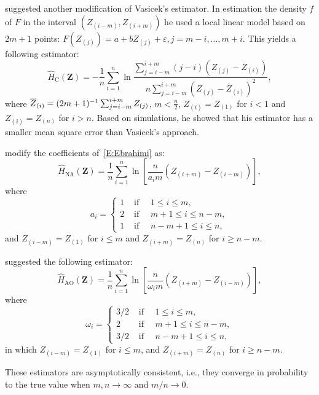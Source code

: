  \citet{correa1995new} suggested another modification of Vasicek's estimator. 
In estimation the density $f$ of $F$ in the interval $\left(Z_{(i-m)}, Z_{(i+m)}\right)$ he used a local linear model based on $2 m+1$ points: $F\left(Z_{(j)}\right)=a+b Z_{(j)}+\varepsilon, j=m-i, \ldots, m+i$. This yields a following estimator:
  \begin{equation}
	\label{E:Correa}
  \widehat{H}_{\text{C}}(\bm{Z})=-\frac{1}{n} \sum_{i=1}^n \ln \frac{\sum_{j=i-m}^{i+m}(j-i)\left(Z_{(j)}-\overline{Z}_{(i)}\right)}{n\sum_{j=i-m}^{i+m}\left(Z_{(j)}-\overline{Z}_{(i)}\right)^2},
  \end{equation} where
  \(\overline{Z}_{(i)}=(2 m+1)^{-1} \sum_{j=i-m}^{i+m} Z_{(j)}\),
  \(m< \frac{n}{2}\), \(Z_{(i)}=Z_{(1)}\) for \(i<1\) and
  \(Z_{(i)}=Z_{(n)}\) for \(i>n\). Based on simulations, he showed that
  his estimator has a smaller mean square error than Vasicek's approach.
	
	 
\citet{rohtua} modify the coefficients of~\eqref{E:Ebrahimi} as: 
\begin{equation}
\label{E:NA}
\widehat{H}_{\text{NA}}(\bm{Z})=\frac{1}{n} \sum_{i=1}^n \ln \left[\frac{n}{a_i m}\left(Z_{(i+m)}-Z_{(i-m)}\right)\right],
\end{equation}
where
$$
a_i=\begin{cases}
1 & \text { if } \quad 1 \leq i \leq m, \\
2 & \text { if } \quad m+1 \leq i \leq n-m, \\
1 & \text { if } \quad n-m+1 \leq i \leq n,
\end{cases}
$$
and $Z_{(i-m)}=Z_{(1)}$ for $i \leq m$ and $Z_{(i+m)}=Z_{(n)}$ for $i \geq n-m$.

\citet{IbrahimAlOmari2014} suggested the following estimator:
	\begin{equation}
\label{E:AO}
  \widehat{H}_{\text{AO}}(\bm{Z})=\frac{1}{n} \sum_{i=1}^n \ln \left[\frac{n}{\omega_i m}\left(Z_{(i+m)}-Z_{(i-m)}\right)\right],
 \end{equation}
	where \[
  \omega_i= \begin{cases}3/2 & \text { if }\quad 1 \leq i \leq m, \\ 2 & \text { if }\quad m+1 \leq i \leq n-m, \\ 3/2 & \text { if } \quad n-m+1 \leq i \leq n,\end{cases}
  \] in which \(Z_{(i-m)}=Z_{(1)}\) for \(i \leq m\), and
  \(Z_{(i+m)}=Z_{(n)}\) for \(i \geq n-m\).


These estimators are asymptotically consistent, i.e., they converge in
probability to the true value when \(m,n\rightarrow\infty\) and
\(m/n\rightarrow0\). 



